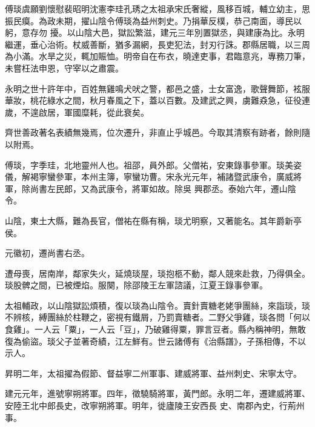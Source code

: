 
\begin{pinyinscope}

 傅琰虞願劉懷慰裴昭明沈憲李珪孔琇之太祖承宋氏奢縱，風移百城，輔立幼主，思振民瘼。為政未期，擢山陰令傅琰為益州刺史。乃捐華反樸，恭己南面，導民以躬，意存勿
 擾。以山陰大邑，獄訟繁滋，建元三年別置獄丞，與建康為比。永明繼運，垂心治術。杖威善斷，猶多漏網，長吏犯法，封刃行誅。郡縣居職，以三周為小滿。水旱之災，輒加賑恤。明帝自在布衣，曉達吏事，君臨意兆，專務刀筆，未嘗枉法申恩，守宰以之肅震。



 永明之世十許年中，百姓無雞鳴犬吠之警，都邑之盛，士女富逸，歌聲舞節，袨服華妝，桃花綠水之間，秋月春風之下，蓋以百數。及建武之興，虜難猋急，征役連歲，不遑啟居，軍國糜耗，從此衰矣。



 齊世善政著名表績無幾焉，位次遷升，非直止乎城邑。今取其清察有跡者，餘則隨以附焉。



 傅琰，字季珪，北地靈州人也。祖邵，員外郎。父僧祐，安東錄事參軍。琰美姿儀，解褐寧蠻參軍，本州主簿，寧蠻功曹。宋永光元年，補諸暨武康令，廣威將軍，除尚書左民郎，又為武康令，將軍如故。除吳
 興郡丞。泰始六年，遷山陰令。



 山陰，東土大縣，難為長官，僧祐在縣有稱，琰尤明察，又著能名。其年爵新亭侯。



 元徽初，遷尚書右丞。



 遭母喪，居南岸，鄰家失火，延燒琰屋，琰抱柩不動，鄰人競來赴救，乃得俱全。琰股髀之間，已被煙焰。服闋，除邵陵王左軍諮議，江夏王錄事參軍。



 太祖輔政，以山陰獄訟煩積，復以琰為山陰令。賣針賣糖老姥爭團絲，來詣琰，琰不辨核，縛團絲於柱鞭之，密視有鐵屑，乃罰賣糖者。二野父爭雞，琰各問「何以食雞」。一人云「粟」，一人云「豆」，乃破雞得粟，罪言豆者。縣內稱神明，無敢復為偷盜。琰父子並著奇績，江左鮮有。世云諸傅有《治縣譜》，子孫相傳，不以示人。



 昇明二年，太祖擢為假節、督益寧二州軍事、建威將軍、益州刺史、宋寧太守。



 建元元年，進號寧朔將軍。四年，徵驍騎將軍，黃門郎。永明二年，遷建威將軍、安陸王北中郎長史，改寧朔將軍。明年，徙廬陵王安西長
 史、南郡內史，行荊州事。




\end{pinyinscope}
